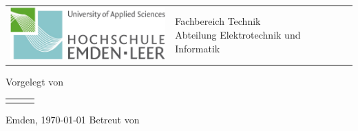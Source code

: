 
\begin{titlepage}
	\hspace{-1.0cm}
	\begin{tabular}{p{8.0cm} p{8.0cm}}
		\includegraphics[width = 6.0cm]{03_Ressourcen/Logo/Technik.png} & %
		\parbox[b]{8.0cm}{
		{\large  Fachbereich Technik }                                    \\
		{\large  Abteilung Elektrotechnik und Informatik }
		}                                                                 \\
		\\
		\hline
	\end{tabular}
	\begin{center}
		\vspace{2.5cm}
		\LARGE{\textsc{\praktikumstitel}}
		\ifx\semester\empty\else\LARGE{\textsc{\semester}}\fi
		\vspace{2cm}%
		\ifx\versuchsnummer\empty\else\LARGE{\textsc{\versuchsnummer}}\fi
		\LARGE{\versuchstitel}
		\vspace{4cm}%
		\large
		\ifx\gruppe\empty\else\gruppe\fi
		\studiengang
		\vspace{0.5cm}
		Vorgelegt von\\
		\begin{table}[!ht]
			\centering
			\begin{tabular}{rll}
				\vornameStudZwei & \nachnameStudZwei & \matrikelnummerStudZwei
			\end{tabular}
		\end{table}
		\vspace{1cm}
		Emden, \today
		\vspace{1.5cm}%
		Betreut von\\
		\betreuerEins\\
		\betreuerZwei
	\end{center}
	\normalsize
\end{titlepage}